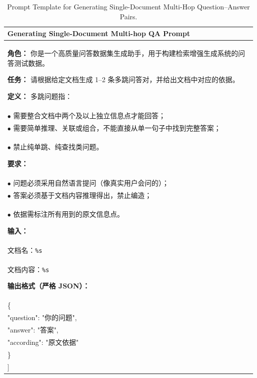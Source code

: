 \begin{table}[t]
\centering
\small

\begin{tabular}{p{}}
\toprule
\textbf{Generating Single-Document Multi-hop QA Prompt} \\
\midrule

\textbf{角色：}
你是一个高质量问答数据集生成助手，用于构建检索增强生成系统的问答测试数据。

\smallskip
\textbf{任务：}
请根据给定文档生成 1--2 条多跳问答对，并给出文档中对应的依据。

\smallskip
\textbf{定义：}
多跳问题指：\\
$\bullet$ 需要整合文档中两个及以上独立信息点才能回答；\\
$\bullet$ 需要简单推理、关联或组合，不能直接从单一句子中找到完整答案；\\
$\bullet$ 禁止纯单跳、纯查找类问题。

\smallskip
\textbf{要求：}\\
$\bullet$ 问题必须采用自然语言提问（像真实用户会问的）；\\
$\bullet$ 答案必须基于文档内容推理得出，禁止编造；\\
$\bullet$ 依据需标注所有用到的原文信息点。

\smallskip
\textbf{输入：}\\
文档名：\texttt{\%s}\\
文档内容：\texttt{\%s}

\smallskip
\textbf{输出格式（严格 JSON）：}

{\ttfamily
[\\
\quad \{\\
\qquad "question": "你的问题",\\
\qquad "answer": "答案",\\
\qquad "according": "原文依据"\\
\quad \}\\
]
}

\\
\bottomrule
\end{tabular}

\caption{Prompt Template for Generating Single-Document Multi-Hop Question--Answer Pairs.}
\label{tab:single-document-multihop-prompt}

\end{table}